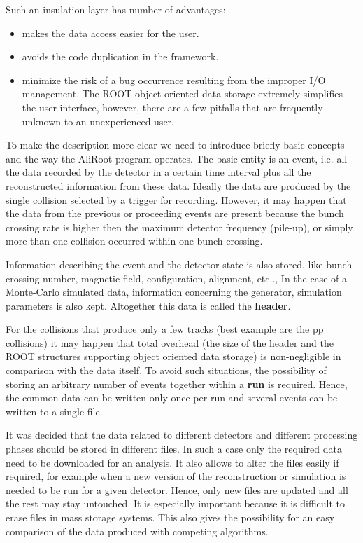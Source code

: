 \documentclass[12pt,a4paper,twoside]{article}
\begin{document}
{Such an insulation layer has number of advantages:
\begin{itemize}
\item makes the data access easier for the user. 
\item avoids the code duplication in the framework.
\item minimize the risk of a bug occurrence resulting from the improper I/O management.
  The ROOT object oriented data storage extremely simplifies the user interface,
  however, there are a few pitfalls that are frequently unknown to an 
  unexperienced user. 
\end{itemize}

To make the description more clear we need to introduce briefly  
basic concepts and the way the AliRoot program operates. 
The basic entity is an event, i.e. all the data recorded by the 
detector in a certain time interval plus all the reconstructed information 
from these data. Ideally the data are produced by the single collision
selected by a trigger for recording. However, it may happen that the data
from the previous or proceeding events are present because the bunch 
crossing rate is higher then the maximum detector frequency (pile-up), 
or simply more than one collision occurred within one bunch crossing.

Information describing the event and the detector state is also
stored, like bunch crossing number, magnetic field, configuration, alignment, etc..,
In the case of a Monte-Carlo simulated data, information concerning the 
generator, simulation parameters is also kept. Altogether this data
is called the \textbf{header}. 

For the collisions that produce only a few tracks (best example 
are the pp collisions) it may happen that total overhead 
(the size of the header and the ROOT structures supporting object oriented 
data storage) is non-negligible in comparison with the data itself.
To avoid such situations, the possibility of storing an arbitrary number 
of events together within a \textbf{run} is required. Hence, the common data can be 
written only once per run and several events can be written to a single file.

It was decided that the data related to different detectors 
and different processing phases should be stored in different files.
In such a case only the required data need to be downloaded for an analysis.
It also allows to alter the files easily if required, 
for example when a new version of the reconstruction or simulation is needed 
to be run for a given detector. Hence, only new files are updated
and all the rest may stay untouched. It is especially important because
it is difficult to erase files in mass storage systems.
This also gives the possibility for an easy comparison of the data produced with 
competing algorithms. 

}
\end{document}

